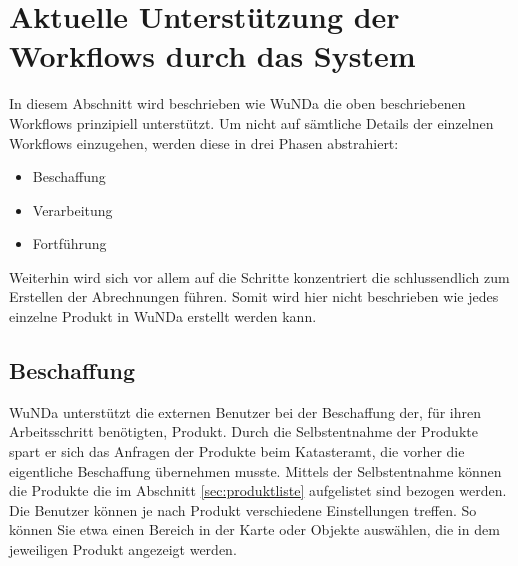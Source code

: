 
\section{Aktuelle Unterstützung der Workflows durch das System}

In diesem Abschnitt wird beschrieben wie \ac{WuNDa} die oben beschriebenen Workflows prinzipiell unterstützt.
Um nicht auf sämtliche Details der einzelnen Workflows einzugehen, werden diese in drei Phasen abstrahiert:
\begin{itemize}
 \item Beschaffung
 \item Verarbeitung
 \item Fortführung
\end{itemize}
Weiterhin wird sich vor allem auf die Schritte konzentriert die schlussendlich zum Erstellen der Abrechnungen führen. Somit wird hier nicht beschrieben wie jedes einzelne Produkt in \ac{WuNDa} erstellt werden kann.

\subsection{Beschaffung}
\ac{WuNDa} unterstützt die externen Benutzer bei der Beschaffung der, für ihren Arbeitsschritt benötigten, Produkt. Durch die Selbstentnahme der Produkte spart er sich das Anfragen der Produkte beim Katasteramt, die vorher die eigentliche Beschaffung übernehmen musste. Mittels der Selbstentnahme können die Produkte die im Abschnitt \ref{sec:produktliste} aufgelistet sind bezogen werden.
Die Benutzer können je nach Produkt verschiedene Einstellungen treffen. So können Sie etwa einen Bereich in der Karte oder Objekte auswählen, die in dem jeweiligen Produkt angezeigt werden.

